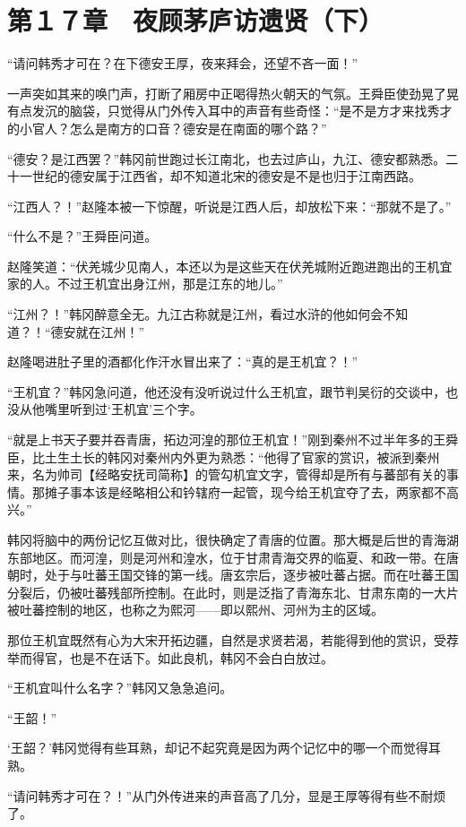 \section{第１７章　夜顾茅庐访遗贤（下）}

“请问韩秀才可在？在下德安王厚，夜来拜会，还望不吝一面！”

一声突如其来的唤门声，打断了厢房中正喝得热火朝天的气氛。王舜臣使劲晃了晃有点发沉的脑袋，只觉得从门外传入耳中的声音有些奇怪：“是不是方才来找秀才的小官人？怎么是南方的口音？德安是在南面的哪个路？”

“德安？是江西罢？”韩冈前世跑过长江南北，也去过庐山，九江、德安都熟悉。二十一世纪的德安属于江西省，却不知道北宋的德安是不是也归于江南西路。

“江西人？！”赵隆本被一下惊醒，听说是江西人后，却放松下来：“那就不是了。”

“什么不是？”王舜臣问道。

赵隆笑道：“伏羌城少见南人，本还以为是这些天在伏羌城附近跑进跑出的王机宜家的人。不过王机宜出身江州，那是江东的地儿。”

“江州？！”韩冈醉意全无。九江古称就是江州，看过水浒的他如何会不知道？！“德安就在江州！”

赵隆喝进肚子里的酒都化作汗水冒出来了：“真的是王机宜？！”

“王机宜？”韩冈急问道，他还没有没听说过什么王机宜，跟节判吴衍的交谈中，也没从他嘴里听到过‘王机宜’三个字。

“就是上书天子要并吞青唐，拓边河湟的那位王机宜！”刚到秦州不过半年多的王舜臣，比土生土长的韩冈对秦州内外更为熟悉：“他得了官家的赏识，被派到秦州来，名为帅司【经略安抚司简称】的管勾机宜文字，管得却是所有与蕃部有关的事情。那摊子事本该是经略相公和钤辖府一起管，现今给王机宜夺了去，两家都不高兴。”

韩冈将脑中的两份记忆互做对比，很快确定了青唐的位置。那大概是后世的青海湖东部地区。而河湟，则是河州和湟水，位于甘肃青海交界的临夏、和政一带。在唐朝时，处于与吐蕃王国交锋的第一线。唐玄宗后，逐步被吐蕃占据。而在吐蕃王国分裂后，仍被吐蕃残部所控制。在此时，则是泛指了青海东北、甘肃东南的一大片被吐蕃控制的地区，也称之为熙河——即以熙州、河州为主的区域。

那位王机宜既然有心为大宋开拓边疆，自然是求贤若渴，若能得到他的赏识，受荐举而得官，也是不在话下。如此良机，韩冈不会白白放过。

“王机宜叫什么名字？”韩冈又急急追问。

“王韶！”

‘王韶？’韩冈觉得有些耳熟，却记不起究竟是因为两个记忆中的哪一个而觉得耳熟。

“请问韩秀才可在？！”从门外传进来的声音高了几分，显是王厚等得有些不耐烦了。

